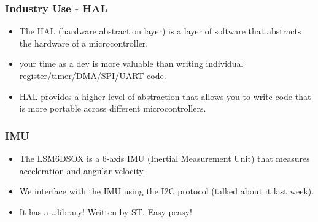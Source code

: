 \documentclass{beamer}
\begin{document}
\begin{frame}
    \frametitle{Industry Use - HAL}
    \begin{itemize}
      \item The HAL (hardware abstraction layer) is a layer of software that abstracts the hardware of a microcontroller.
      \item your time as a dev is more valuable than writing individual register/timer/DMA/SPI/UART code.
      \item HAL provides a higher level of abstraction that allows you to write code that is more portable across different microcontrollers.
    \end{itemize}
\end{frame}


\begin{frame}
  \frametitle{IMU}
    \begin{itemize}
      \item The LSM6DSOX is a 6-axis IMU (Inertial Measurement Unit) that measures acceleration and angular velocity.
      \item We interface with the IMU using the I2C protocol (talked about it last week).
      \item It has a \dots library! Written by ST. Easy peasy!
    \end{itemize}
\end{frame}
\end{document}
